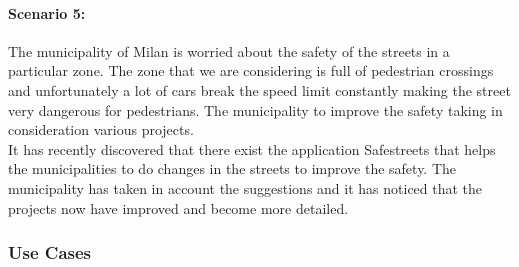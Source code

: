 \documentclass[titlepage]{article}
\begin{document}
\paragraph{Scenario 5:} The municipality of Milan is worried about the safety of the streets in a particular zone. The zone that we are considering is full of pedestrian crossings and unfortunately a lot of cars break  the speed limit constantly making the street very dangerous for pedestrians. The municipality to improve the safety taking in consideration various projects.\\
It has recently discovered that there exist the application Safestreets that helps the municipalities to do changes in the streets to improve the safety. The municipality has taken in account the suggestions and it has noticed that the projects now have improved and become more detailed.

\subsubsection{Use Cases}
\end{document}
